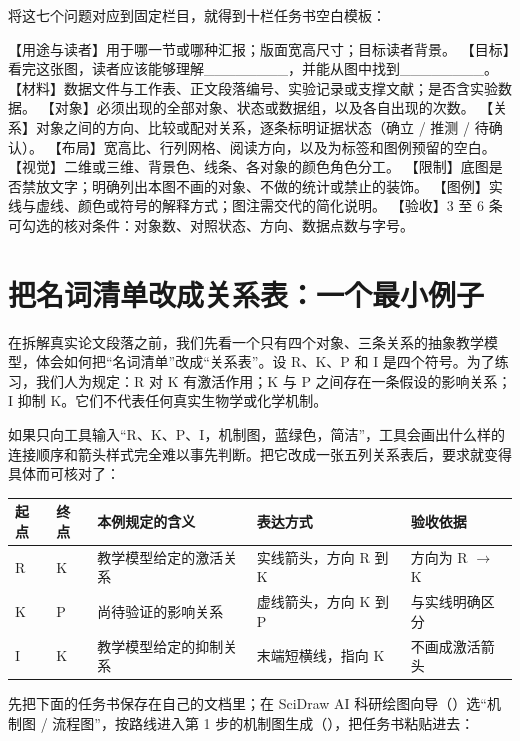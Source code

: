 将这七个问题对应到固定栏目，就得到十栏任务书空白模板：

\begin{Prompt}
【用途与读者】用于哪一节或哪种汇报；版面宽高尺寸；目标读者背景。
【目标】看完这张图，读者应该能够理解________，并能从图中找到________。
【材料】数据文件与工作表、正文段落编号、实验记录或支撑文献；是否含实验数据。
【对象】必须出现的全部对象、状态或数据组，以及各自出现的次数。
【关系】对象之间的方向、比较或配对关系，逐条标明证据状态（确立 / 推测 / 待确认）。
【布局】宽高比、行列网格、阅读方向，以及为标签和图例预留的空白。
【视觉】二维或三维、背景色、线条、各对象的颜色角色分工。
【限制】底图是否禁放文字；明确列出本图不画的对象、不做的统计或禁止的装饰。
【图例】实线与虚线、颜色或符号的解释方式；图注需交代的简化说明。
【验收】3 至 6 条可勾选的核对条件：对象数、对照状态、方向、数据点数与字号。
\end{Prompt}

\section{把名词清单改成关系表：一个最小例子}

在拆解真实论文段落之前，我们先看一个只有四个对象、三条关系的抽象教学模型，体会如何把“名词清单”改成“关系表”。设 R、K、P 和 I 是四个符号。为了练习，我们人为规定：R 对 K 有激活作用；K 与 P 之间存在一条假设的影响关系；I 抑制 K。它们不代表任何真实生物学或化学机制。

如果只向工具输入“R、K、P、I，机制图，蓝绿色，简洁”，工具会画出什么样的连接顺序和箭头样式完全难以事先判断。把它改成一张五列关系表后，要求就变得具体而可核对了：

\begin{center}\small
\begin{tabularx}{\linewidth}{YYYYY}
\toprule
\textbf{起点} & \textbf{终点} & \textbf{本例规定的含义} & \textbf{表达方式} & \textbf{验收依据} \\
\midrule
R & K & 教学模型给定的激活关系 & 实线箭头，方向 R 到 K & 方向为 R \ensuremath{\rightarrow} K \\
K & P & 尚待验证的影响关系 & 虚线箭头，方向 K 到 P & 与实线明确区分 \\
I & K & 教学模型给定的抑制关系 & 末端短横线，指向 K & 不画成激活箭头 \\
\bottomrule
\end{tabularx}
\end{center}

先把下面的任务书保存在自己的文档里；在 SciDraw AI 科研绘图向导（）选“机制图 / 流程图”，按路线进入第 1 步的机制图生成（），把任务书粘贴进去：


